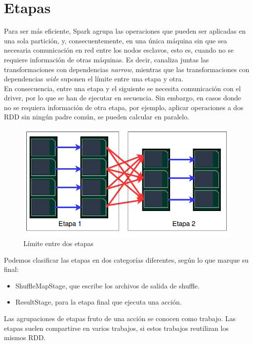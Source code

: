 \section{Etapas}
Para ser más eficiente, Spark agrupa las operaciones que pueden ser aplicadas en una sola partición, y, consecuentemente, en una única máquina sin que sea necesaria comunicación en red entre los nodos esclavos, esto es, cuando no se requiere información de otras máquinas. Es decir, canaliza juntas las transformaciones con dependencias \textit{narrow}, mientras que las transformaciones con dependencias \textit{wide} suponen el límite entre una etapa y otra.\\

En consecuencia, entre una etapa y el siguiente se necesita comunicación con el driver, por lo que se han de ejecutar en secuencia. Sin embargo, en casos donde no se requiera información de otra etapa, por ejemplo, aplicar operaciones a dos RDD sin ningún padre común, se pueden calcular en paralelo.\\

\begin{figure}[H]
	\includegraphics[scale=0.6]{img/etapas} 
	\centering
	\caption{Límite entre dos etapas}
	\label{etapas}
\end{figure}

Podemos clasificar las etapas en dos categorías diferentes, según lo que marque su final:\\

\begin{itemize}
\item ShuffleMapStage, que escribe los archivos de salida de shuffle.
\item ResultStage, para la etapa final que ejecuta una acción.
\end{itemize}

Las agrupaciones de etapas fruto de una acción se conocen como trabajo. Las etapas suelen compartirse en varios trabajos, si estos trabajos reutilizan los mismos RDD.\\

